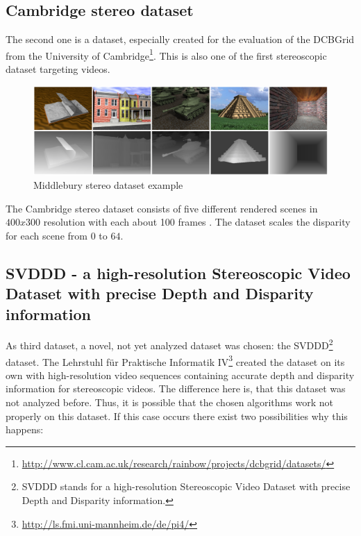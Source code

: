 \subsection*{Cambridge stereo dataset}

The second one is a dataset, especially created for the evaluation of the DCBGrid from the University of Cambridge\footnote{\url{http://www.cl.cam.ac.uk/research/rainbow/projects/dcbgrid/datasets/}}.
This is also one of the first stereoscopic dataset targeting videos.

\begin{figure}[h!]
  \centering
  \includegraphics[width=1.0\textwidth]{src/images/dbcgrid-dataset.png}
  \caption[Middlebury stereo dataset example]{Middlebury stereo dataset example}
  \label{fig:dbcgrid-dataset}
\end{figure}

\noindent The Cambridge stereo dataset consists of five different rendered scenes in $400x300$ resolution with each about 100 frames \citep{richardt2010real}.
The dataset scales the disparity for each scene from $0$ to $64$.

\subsection*{SVDDD - a high-resolution Stereoscopic Video Dataset with precise Depth and Disparity information}

As third dataset, a novel, not yet analyzed dataset was chosen: the SVDDD\footnote{SVDDD stands for a high-resolution Stereoscopic Video Dataset with precise Depth and Disparity information.} dataset.
The Lehrstuhl f{\"u}r Praktische Informatik IV\footnote{\url{http://ls.fmi.uni-mannheim.de/de/pi4/}} created the dataset on its own with high-resolution video sequences containing accurate depth and disparity information for stereoscopic videos.
\newline\newline\noindent The difference here is, that this dataset was not analyzed before.
Thus, it is possible that the chosen algorithms work not properly on this dataset.
If this case occurs there exist two possibilities why this happens:

